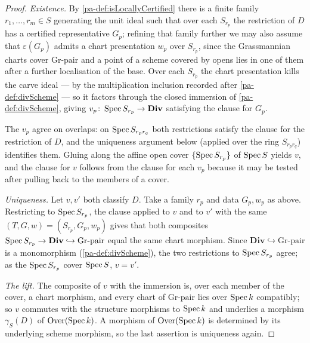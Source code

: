 \begin{proof}
  \leanok
  \emph{Existence.} By \ref{pa-def:isLocallyCertified} there is a finite family
  \(r_1,\dots,r_m \in S\) generating the unit ideal such that over each \(S_{r_p}\) the
  restriction of \(D\) has a certified representative \(G_p\); refining that family further
  we may also assume that \(\varepsilon(G_p)\) admits a chart presentation \(w_p\) over
  \(S_{r_p}\), since the Grassmannian charts cover \(\mathrm{Gr}\text{-pair}\) and a point
  of a scheme covered by opens lies in one of them after a further localisation of the
  base. Over each \(S_{r_p}\) the chart presentation kills the carve ideal --- by the
  multiplication inclusion recorded after \ref{pa-def:divScheme} --- so it factors through the
  closed immersion of \ref{pa-def:divScheme}, giving \(v_p \colon \operatorname{Spec} S_{r_p} \to
  \mathbf{Div}\) satisfying the clause for \(G_p\).

  The \(v_p\) agree on overlaps: on \(\operatorname{Spec} S_{r_p r_q}\) both restrictions satisfy the
  clause for the restriction of \(D\), and the uniqueness argument below (applied over the
  ring \(S_{r_p r_q}\)) identifies them. Gluing along the affine open cover \(\{\operatorname{Spec}
  S_{r_p}\}\) of \(\operatorname{Spec} S\) yields \(v\), and the clause for \(v\) follows from the clause
  for each \(v_p\) because it may be tested after pulling back to the members of a cover.

  \emph{Uniqueness.} Let \(v, v'\) both classify \(D\). Take a family \(r_p\) and data
  \(G_p, w_p\) as above. Restricting to \(\operatorname{Spec} S_{r_p}\), the clause applied to \(v\) and
  to \(v'\) with the same \((T, G, w) = (S_{r_p}, G_p, w_p)\) gives that both composites
  \(\operatorname{Spec} S_{r_p} \to \mathbf{Div} \hookrightarrow \mathrm{Gr}\text{-pair}\) equal the same
  chart morphism. Since \(\mathbf{Div} \hookrightarrow \mathrm{Gr}\text{-pair}\) is a
  monomorphism (\ref{pa-def:divScheme}), the two restrictions to \(\operatorname{Spec} S_{r_p}\) agree; as
  the \(\operatorname{Spec} S_{r_p}\) cover \(\operatorname{Spec} S\), \(v = v'\).

  \emph{The lift.} The composite of \(v\) with the immersion is, over each member of the
  cover, a chart morphism, and every chart of \(\mathrm{Gr}\text{-pair}\) lies over
  \(\operatorname{Spec} k\) compatibly; so \(v\) commutes with the structure morphisms to \(\operatorname{Spec} k\) and
  underlies a morphism \(\gamma_S(D)\) of \(\mathrm{Over}(\operatorname{Spec} k)\). A morphism of
  \(\mathrm{Over}(\operatorname{Spec} k)\) is determined by its underlying scheme morphism, so the last assertion
  is uniqueness again.
\end{proof}

